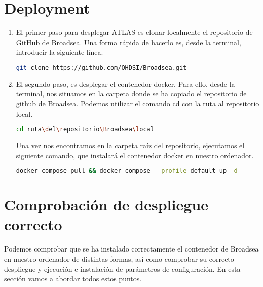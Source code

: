 \section{Deployment}
\begin{enumerate}
    \item El primer paso para desplegar ATLAS es clonar localmente el repositorio de GitHub de Broadsea. Una forma rápida de hacerlo es, desde la terminal, introducir la siguiente línea.

\begin{lstlisting}[language=sh]
        git clone https://github.com/OHDSI/Broadsea.git
\end{lstlisting}

    \item El segundo paso, es desplegar el contenedor docker. Para ello, desde la terminal, nos situamos en la carpeta donde se ha copiado el repositorio de github de Broadsea. Podemos utilizar el comando cd con la ruta al repositorio local.

\begin{lstlisting}[language=sh]
        cd ruta\del\repositorio\Broadsea\local
\end{lstlisting}

    Una vez nos encontramos en la carpeta raíz del repositorio, ejecutamos el siguiente comando, que instalará el contenedor docker en nuestro ordenador.

\begin{lstlisting}[language=sh]
    docker compose pull && docker-compose --profile default up -d
\end{lstlisting}

\end{enumerate}

\section{Comprobación de despliegue correcto} 

Podemos comprobar que se ha instalado correctamente el contenedor de Broadsea en nuestro ordenador de distintas formas, así como comprobar su correcto despliegue y ejecución e instalación de parámetros de configuración. En esta sección vamos a abordar todos estos puntos.

